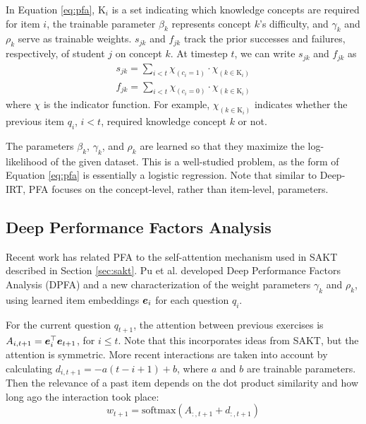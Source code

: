 In Equation \ref{eq:pfa}, $\text{K}_i$ is a set indicating which knowledge concepts are required for item $i$, the trainable parameter $\beta_k$ represents concept $k$'s difficulty, and $\gamma_k$ and $\rho_k$ serve as trainable weights. $s_{jk}$ and $f_{jk}$ track the prior successes and failures, respectively, of student $j$ on concept $k$. At timestep $t$, we can write $s_{jk}$ and $f_{jk}$ as 
\begin{equation}
  \begin{split}
    s_{jk} = \sum_{i<t} \chi_{(c_i=1)} \cdot \chi_{(k \in \text{K}_i)} \\
    f_{jk} = \sum_{i<t} \chi_{(c_i=0)} \cdot \chi_{(k \in \text{K}_i)}
  \end{split}
  \label{eq:pfa_indicator}
\end{equation}
where $\chi$ is the indicator function. For example, $\chi_{(k\in \text{K}_i)}$ indicates whether the previous item $q_i$, $i<t$, required knowledge concept $k$ or not.

The parameters $\beta_k$, $\gamma_k$, and $\rho_k$ are learned so that they maximize the log-likelihood of the given dataset. This is a well-studied problem, as the form of Equation \ref{eq:pfa} is essentially a logistic regression. Note that similar to Deep-IRT, PFA focuses on the concept-level, rather than item-level, parameters. 

\subsection{Deep Performance Factors Analysis}
Recent work has related PFA to the self-attention mechanism used in SAKT described in Section \ref{sec:sakt}. Pu et al. \cite{deep_pfa} developed Deep Performance Factors Analysis (DPFA) and a new characterization of the weight parameters $\gamma_k$ and $\rho_k$, using learned item embeddings $\boldsymbol{e}_i$ for each question $q_i$.

For the current question $q_{t+1}$, the attention between previous exercises is $A_{i,t+1} = \boldsymbol{e}_i^\top \boldsymbol{e}_{t+1}$, for $i \leq t$. Note that this incorporates ideas from SAKT, but the attention is symmetric. More recent interactions are taken into account by calculating $d_{i,t+1} = -a(t-i+1)+b$, where $a$ and $b$ are trainable parameters. Then the relevance of a past item depends on the dot product similarity and how long ago the interaction took place:
\begin{equation}
  w_{t+1} = \text{softmax}(A_{:,t+1} + d_{:,t+1})
  \label{eq:time_bias_attn}
\end{equation}

